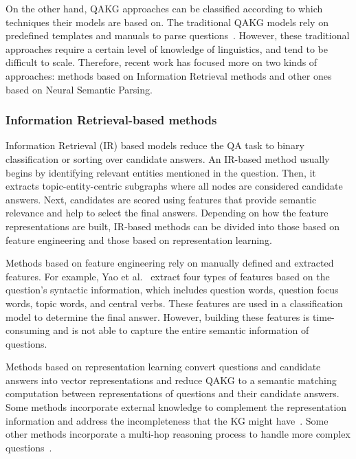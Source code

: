 On the other hand, QAKG approaches can be classified according to which techniques their models 
are based on. The traditional QAKG models rely on predefined templates and manuals to parse 
questions~\cite{qa:core-techniques-DiefenbachLSM18}. However, these traditional approaches require 
a certain level of knowledge of linguistics, and tend to be difficult to scale. Therefore, recent 
work has focused more on two kinds of approaches: methods based on Information Retrieval methods 
and other ones based on Neural Semantic Parsing.

\subsubsection{Information Retrieval-based methods}
\label{cap2:theoFrame/qakg/approaches/infRetrieval}
Information Retrieval (IR) based models reduce the QA task to binary classification or sorting 
over candidate answers. An IR-based method usually begins by identifying relevant entities 
mentioned in the question. Then, it extracts topic-entity-centric subgraphs where all nodes are 
considered candidate answers. Next, candidates are scored using features that provide semantic 
relevance and help to select the final answers. Depending on how the feature representations 
are built, IR-based methods can be divided into those based on feature engineering and those 
based on representation learning.

Methods based on feature engineering rely on manually defined and extracted features. For 
example, Yao et al.~\cite{qa:YaoD14} extract four types of features based on the question’s 
syntactic information, which includes question words, question focus words, topic words, and 
central verbs. These features are used in a classification model to determine the final answer. 
However, building these features is time-consuming and is not able to capture the entire 
semantic information of questions.

Methods based on representation learning convert questions and candidate answers into vector 
representations and reduce QAKG to a semantic matching computation between representations of 
questions and their candidate answers. Some methods incorporate external knowledge to complement 
the representation information and address the incompleteness that the KG might 
have~\cite{qa:XuRFHZ16,qa:SunDZMSC18,qa:TrouillonWRGB16}. Some other methods incorporate a 
multi-hop reasoning process to handle more complex questions~\cite{qa:SukhbaatarSWF15,qa:MillerFDKBW16,qa:QiuWJZ20}.

